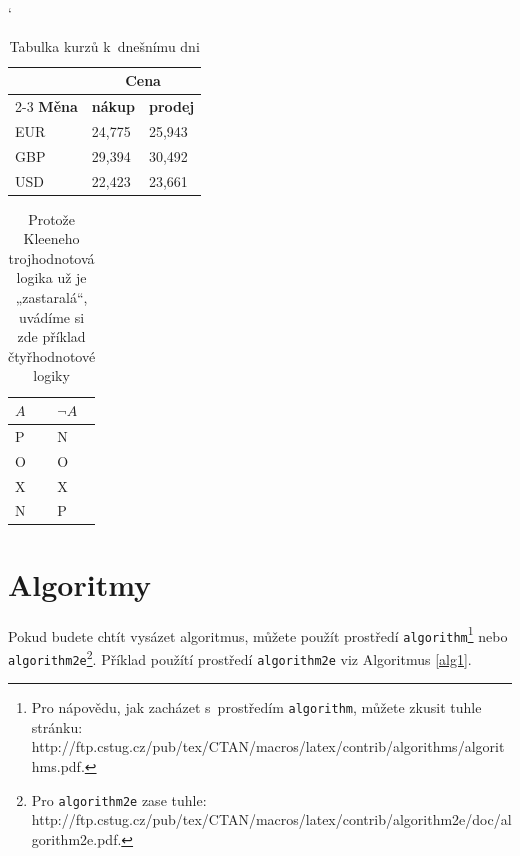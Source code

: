 \documentclass[a4paper,11pt]{article}
\begin{document}
\begin{table}[ht]
\begin{center}
\catcode`
\begin{tabular}{|l|ll|}
\hline
\multicolumn{1}{|c|}{} & \multicolumn{2}{c|}{\textbf{Cena}}                            \\ \cline{2-3} 
\textbf{Měna}          & \multicolumn{1}{l|}{\textbf{nákup}}     & \textbf{prodej}     \\ \hline
EUR                    & \multicolumn{1}{l|}{24,775}             & 25,943              \\ 
GBP                    & \multicolumn{1}{l|}{29,394}             & 30,492              \\ 
USD                    & \multicolumn{1}{l|}{22,423}             & 23,661              \\ \hline
\end{tabular}
\caption{Tabulka kurzů k~dnešnímu dni}
\label{table:1}
\end{center}
\end{table}

\begin{table}[h]
    \centering
    \begin{tabular}{|l|l|}
    \hline
    $A$ & $\neg A$ \\ \hline
    P & N    \\ \hline
    O~& O~\\ \hline
    X & X    \\ \hline
    N & P    \\ \hline
    \end{tabular}
    \caption{Protože Kleeneho trojhodnotová logika už je „zastaralá“, uvádíme si zde příklad čtyřhodnotové logiky}
    \label{table:2}
\end{table}

\newpage
\section{Algoritmy}
Pokud budete chtít vysázet algoritmus, můžete použít prostředí \texttt{algorithm}\footnote{Pro nápovědu, jak zacházet s~prostředím \texttt{algorithm}, můžete zkusit tuhle stránku:\\http://ftp.cstug.cz/pub/tex/CTAN/macros/latex/contrib/algorithms/algorithms.pdf.} nebo \texttt{algorithm2e}\footnote{Pro \texttt{algorithm2e} zase tuhle: http://ftp.cstug.cz/pub/tex/CTAN/macros/latex/contrib/algorithm2e/doc/algorithm2e.pdf.}. Příklad použítí prostředí \texttt{algorithm2e} viz Algoritmus \ref{alg1}.
\end{document}
